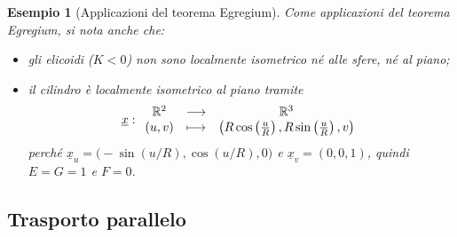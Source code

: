 \documentclass[12pt]{scrartcl}
\theoremstyle{style}
\newtheorem{esempio}{Esempio}[section]
\numberwithin{equation}{subsection}
\begin{document}
\begin{esempio}
	[Applicazioni del teorema Egregium]
Come applicazioni del teorema Egregium, si nota anche che:
\begin{itemize}
	\item gli elicoidi ($K<0$) non sono localmente isometrico n\'e alle sfere, n\'e al piano;
	\item il cilindro \`e localmente isometrico al piano tramite
		\[
		\underline{x}:
		\begin{array}
			{c c c}
			\mathbb{R}^2 & \longrightarrow & \mathbb{R}^3\\
			(u,v) & \longmapsto & \left(R \cos \left(\frac{u}{R}\right) , R \sin \left(\frac{u}{R}\right) , v\right) 
		\end{array}
		\] 
		perch\'e $\underline{x}_u= \big(- \sin (u / R), \cos ( u / R) , 0\big)$ e $\underline{x}_v = (0,0,1)$, quindi $E =G=1$ e $F=0$.
\end{itemize}
\end{esempio}


\subsection{Trasporto parallelo}
\end{document}
